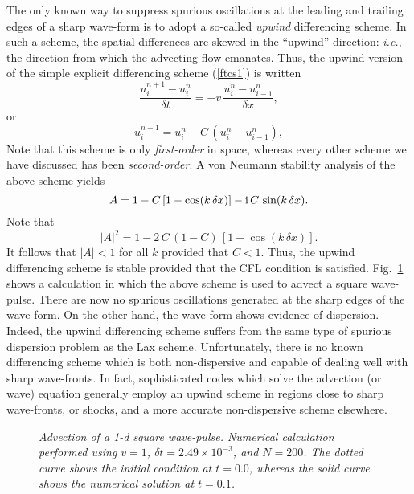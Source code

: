 The only known way to suppress spurious oscillations 
at  the leading and trailing edges of a sharp wave-form is to adopt a so-called {\em upwind}
differencing scheme. In such a scheme, the spatial differences are skewed in the ``upwind''
direction: {\em i.e.}, the direction from which the advecting flow emanates. Thus, the
upwind version of the simple explicit differencing scheme (\ref{ftcs1})
is written
\begin{equation}
\frac{u_i^{n+1} - u_i^n}{\delta t} = - v\,\frac{u_{i}^n-u_{i-1}^n}{\delta x},
\end{equation}
or
\begin{equation}
u_i^{n+1} = u_i^n -C\,(u_{i}^n-u_{i-1}^n),
\end{equation}
Note that this scheme is only {\em first-order} in space, whereas every other scheme
we have discussed has been {\em second-order}. A von Neumann stability analysis
of the above scheme yields
\begin{equation}
A = 1 - C\,[1-\cos (k \,\delta x)]-{\rm i} \,C\,\sin (k \,\delta x).
\end{equation}
Note that 
\begin{equation}
|A|^2 =1-2\,C\,(1-C)\,[1-\cos (k \,\delta x)].
\end{equation}
It follows that $|A|<1$ for all $k$ provided that $C<1$. Thus, the upwind differencing
scheme is stable provided that the CFL condition is satisfied.
Fig.~\ref{upwind2}  shows a calculation in which the  above scheme 
is used to advect a square wave-pulse. There are now no spurious oscillations generated
at the sharp edges of the wave-form. On the other hand, the wave-form shows evidence
of dispersion. Indeed, the upwind differencing scheme suffers from the
same type of spurious dispersion problem as the Lax scheme. 
Unfortunately, there is no known  differencing scheme which is both
non-dispersive and
capable of dealing well with sharp wave-fronts.
In fact, sophisticated
codes which solve the  advection (or wave) equation generally employ an upwind scheme in regions close to
sharp wave-fronts, or shocks, and a more accurate non-dispersive scheme elsewhere. 

\begin{figure}
\epsfysize=3in
\centerline{}
\caption{\em Advection of a 1-d square wave-pulse.
Numerical  calculation performed using
$v=1$, $\delta t = 2.49\times 10^{-3}$, and $N=200$.  The
dotted curve shows the initial condition at $t=0.0$, whereas the solid curve shows the numerical solution
at $t=0.1$.}\label{upwind2}
\end{figure}

